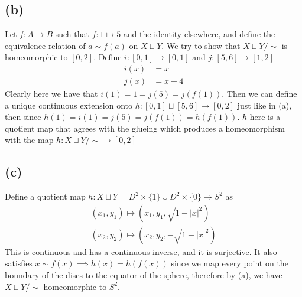 \documentclass[a4paper,11pt]{article}
\begin{document}
\subsection{(b)}
Let $f \colon A \to B$ such that $f \colon 1 \mapsto 5$ and the identity elsewhere, and define the equivalence relation of $a \sim f(a)$ on $X \sqcup Y$. We try to show that $X \sqcup Y /\sim $ is homeomorphic to $[0,2]$. Define $i \colon [0,1] \to [0,1]$ and $j \colon [5,6] \to [1,2]$ 
\begin{align}
	i(x) &= x \\
	j(x) &= x-4 
\end{align}
Clearly here we have that $i(1) = 1 = j(5) = j(f(1))$. Then we can define a unique continuous extension onto $h \colon [0,1] \sqcup [5,6] \to [0,2]$ just like in (a), then since $h(1) = i(1) = j(5) = j(f(1)) = h(f(1))$. $h$ here is a quotient map that agrees with the glueing which produces a homeomorphism with the map $\bar{h} \colon X \sqcup Y / \sim \to [0,2]$ 
\subsection{(c)}
Define a quotient map $h \colon X \sqcup Y = D^2 \times \{1\} \cup D^2 \times \{0\} \to S^2$ as
\begin{align}
	(x_1,y_1) \mapsto (x_1,y_1,\sqrt{1-|x|^2})\\
	(x_2,y_2) \mapsto (x_2,y_2,-\sqrt{1-|x|^2})
\end{align}
This is continuous and has a continuous inverse, and it is surjective. It also satisfies $x \sim f(x) \implies h(x) = h(f(x))$ since we map every point on the boundary of the discs to the equator of the sphere, therefore by (a), we have $ X \sqcup Y/\sim$ homeomorphic to $S^2$.
\end{document}
